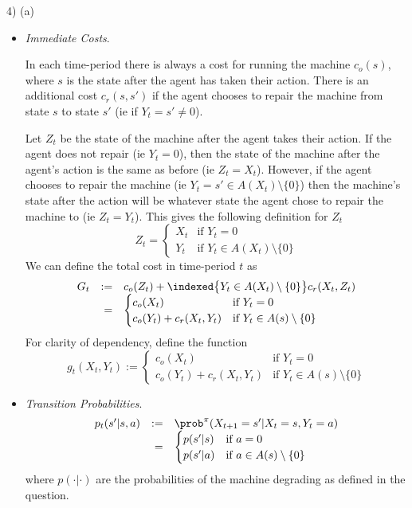 \documentclass[11pt,a4paper]{article}
\begin{document}
\begin{answer}{4) (a)}
\begin{itemize}
    \item \textit{Immediate Costs}.
    \par In each time-period there is always a cost for running the machine $c_o(s)$, where $s$ is the state after the agent has taken their action. There is an additional cost $c_r(s,s')$ if the agent chooses to repair the machine from state $s$ to state $s'$ (ie if $Y_t=s'\neq0$).
    \par Let $Z_t$ be the state of the machine after the agent takes their action. If the agent does not repair (ie $Y_t=0$), then the state of the machine after the agent's action is the same as before (ie $Z_t=X_t$). However, if the agent chooses to repair the machine (ie $Y_t=s'\in A(X_t)\setminus\{0\}$) then the machine's state after the action will be whatever state the agent chose to repair the machine to (ie $Z_t=Y_t$). This gives the following definition for $Z_t$
    \[ Z_t=\begin{cases}
         X_t&\text{if }Y_t=0\\
         Y_t&\text{if }Y_t\in A(X_t)\setminus\{0\}
       \end{cases}\]
    We can define the total cost in time-period $t$ as
    \[\begin{array}{rrl}
      G_t&:=&c_o(Z_t)+\indexed\big\{Y_t\in A(X_t)\setminus\{0\}\big\}c_r(X_t,Z_t)\\
      &=&\begin{cases}
              c_o(X_t)&\text{if }Y_t=0\\
              c_o(Y_t)+c_r(X_t,Y_t)&\text{if }Y_t\in A(s)\setminus\{0\}
            \end{cases}
    \end{array}\]
    For clarity of dependency, define the function
    \[ g_t(X_t,Y_t):=\begin{cases}
                       c_o(X_t)&\text{if }Y_t=0\\
                       c_o(Y_t)+c_r(X_t,Y_t)&\text{if }Y_t\in A(s)\setminus\{0\}
                       \end{cases}\]

    \item \textit{Transition Probabilities}.
    \[\begin{array}{rrl}
      p_t(s'|s,a)&:=&\prob^\pi(X_{t+1}=s'|X_t=s,Y_t=a)\\
      &=&\begin{cases}
           p(s'|s)&\text{if }a=0\\
           p(s'|a)&\text{if }a\in A(s)\setminus\{0\}
         \end{cases}
    \end{array}\]
    where $p(\cdot|\cdot)$ are the probabilities of the machine degrading as defined in the question.


\end{itemize}
\end{answer}
\end{document}

